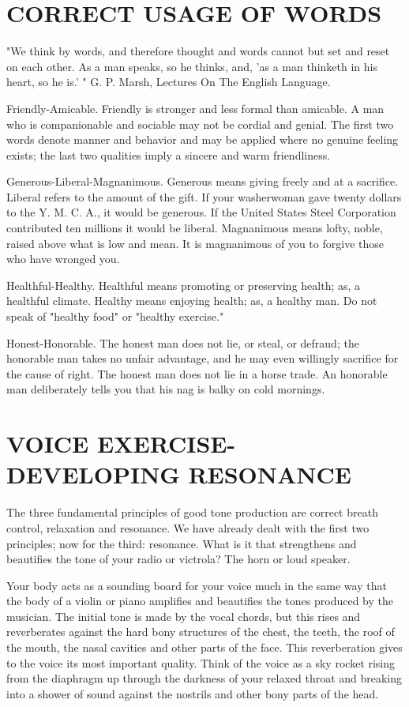 \documentclass[10pt]{article}
\begin{document}
\section*{CORRECT USAGE OF WORDS}
"We think by words, and therefore thought and words cannot but set and reset on each other. As a man speaks, so he thinks, and, 'as a man thinketh in his heart, so he is.' " G. P. Marsh, Lectures On The English Language.

Friendly-Amicable. Friendly is stronger and less formal than amicable. A man who is companionable and sociable may not be cordial and genial. The first two words denote manner and behavior and may be applied where no genuine feeling exists; the last two qualities imply a sincere and warm friendliness.

Generous-Liberal-Magnanimous. Generous means giving freely and at a sacrifice. Liberal refers to the amount of the gift. If your washerwoman gave twenty dollars to the Y. M. C. A., it would be generous. If the United States Steel Corporation contributed ten millions it would be liberal. Magnanimous means lofty, noble, raised above what is low and mean. It is magnanimous of you to forgive those who have wronged you.

Healthful-Healthy. Healthful means promoting or preserving health; as, a healthful climate. Healthy means enjoying health; as, a healthy man. Do not speak of "healthy food" or "healthy exercise."

Honest-Honorable. The honest man does not lie, or steal, or defraud; the honorable man takes no unfair advantage, and he may even willingly sacrifice for the cause of right. The honest man does not lie in a horse trade. An honorable\\
man deliberately tells you that his nag is balky on cold mornings.

\section*{VOICE EXERCISE-DEVELOPING RESONANCE}
The three fundamental principles of good tone production are correct breath control, relaxation and resonance. We have already dealt with the first two principles; now for the third: resonance. What is it that strengthens and beautifies the tone of your radio or victrola? The horn or loud speaker.

Your body acts as a sounding board for your voice much in the same way that the body of a violin or piano amplifies and beautifies the tones produced by the musician. The initial tone is made by the vocal chords, but this rises and reverberates against the hard bony structures of the chest, the teeth, the roof of the mouth, the nasal cavities and other parts of the face. This reverberation gives to the voice its most important quality. Think of the voice as a sky rocket rising from the diaphragm up through the darkness of your relaxed throat and breaking into a shower of sound against the nostrils and other bony parts of the head.
\end{document}

